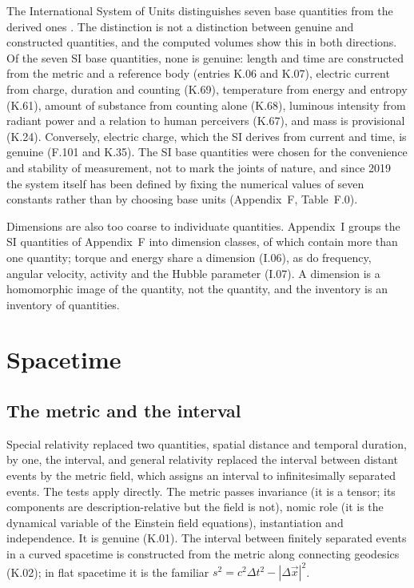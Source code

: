 \documentclass{situationist-preprint}
\begin{document}
The International System of Units distinguishes seven base quantities from the derived ones \citep{BIPM2019}. The distinction is not a distinction between genuine and constructed quantities, and the computed volumes show this in both directions. Of the seven SI base quantities, none is genuine: length and time are constructed from the metric and a reference body (entries K.06 and K.07), electric current from charge, duration and counting (K.69), temperature from energy and entropy (K.61), amount of substance from counting alone (K.68), luminous intensity from radiant power and a relation to human perceivers (K.67), and mass is provisional (K.24). Conversely, electric charge, which the SI derives from current and time, is genuine (F.101 and K.35). The SI base quantities were chosen for the convenience and stability of measurement, not to mark the joints of nature, and since 2019 the system itself has been defined by fixing the numerical values of seven constants rather than by choosing base units (Appendix~F, Table~F.0).

Dimensions are also too coarse to individuate quantities. Appendix~I groups the \vvNF{} SI quantities of Appendix~F into \vvNIclasses{} dimension classes, of which \vvNImulti{} contain more than one quantity; torque and energy share a dimension (I.06), as do frequency, angular velocity, activity and the Hubble parameter (I.07). A dimension is a homomorphic image of the quantity, not the quantity, and the inventory is an inventory of quantities.

\section{Spacetime}\label{s:spacetime}

\subsection{The metric and the interval}

Special relativity replaced two quantities, spatial distance and temporal duration, by one, the interval, and general relativity replaced the interval between distant events by the metric field, which assigns an interval to infinitesimally separated events. The tests apply directly. The metric passes invariance (it is a tensor; its components are description-relative but the field is not), nomic role (it is the dynamical variable of the Einstein field equations), instantiation and independence. It is genuine (K.01). The interval between finitely separated events in a curved spacetime is constructed from the metric along connecting geodesics (K.02); in flat spacetime it is the familiar $s^2 = c^2\Delta t^2 - |\Delta\vec x|^2$.
\end{document}
